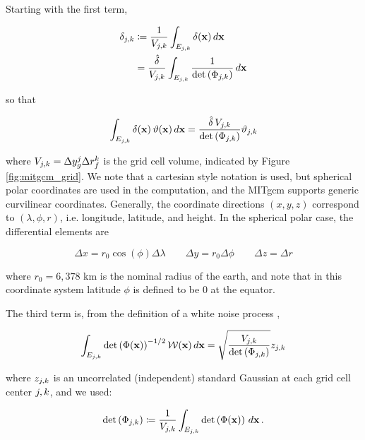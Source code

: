 Starting with the first term,
\begin{linenomath*}\begin{equation*}
    \begin{aligned}
        \delta_{j,k} &\coloneqq \dfrac{1}{V_{j,k}}\int_{E_{j,k}}\delta(\mathbf{x})\,d\mathbf{x}
        \\
                   &=
                   \dfrac{\hat{\delta}}{V_{j,k}}\int_{E_{j,k}}\dfrac{1}{\text{det}\left(\Phi_{{j,k}}\right)}\,d\mathbf{x}
    \end{aligned}
\end{equation*}\end{linenomath*}
so that
\begin{linenomath*}\begin{equation*}
    \int_{E_{j,k}} \delta(\mathbf{x})\,\vartheta(\mathbf{x})\, d\mathbf{x} =
    \dfrac{\hat{\delta}\,V_{j,k}}{\text{det}\left(\Phi_{{j,k}}\right)}\vartheta_{j,k}
\end{equation*}\end{linenomath*}
where $V_{j,k} = \Delta y^{j}_{g} \Delta r_f^k$ is the grid cell volume,
indicated by Figure \ref{fig:mitgcm_grid}.
We note that a cartesian style notation
is used, but spherical polar coordinates are used in the computation, and the
MITgcm supports generic curvilinear coordinates.
Generally, the coordinate directions $(x,y,z)$ correspond to $(\lambda,\phi,r)$,
i.e. longitude, latitude, and height.
In the spherical polar case, the differential elements are
\begin{linenomath*}\begin{equation*}
    \Delta x = r_0 \cos(\phi)\Delta\lambda \qquad
    \Delta y = r_0 \Delta \phi \qquad
    \Delta z = \Delta r
\end{equation*}\end{linenomath*}
where $r_0 = 6,378$ km is the nominal radius of the earth, and note that in this
coordinate system latitude $\phi$ is defined to be 0 at the equator.

The third term is, from the definition of a white noise process
\citep{adler_random_2007},
\begin{linenomath*}\begin{equation*}
    \int_{E_{j,k}}\text{det}\left(\Phi(\mathbf{x})\right)^{-1/2}\mathcal{W}(\mathbf{x}) \, d\mathbf{x}
        = \sqrt{\dfrac{V_{j,k}}{\text{det}\left(\Phi_{{j,k}}\right)}} z_{j,k}
\end{equation*}\end{linenomath*}
where $z_{j,k}$ is an uncorrelated (independent) standard Gaussian at each grid
cell center ${j,k}$, and we used:
\begin{linenomath*}\begin{equation*}
    \text{det}\left(\Phi_{{j,k}}\right) \coloneqq
    \dfrac{1}{V_{j,k}}\int_{E_{j,k}}\text{det}\left(\Phi(\mathbf{x})\right)\,d\mathbf{x}\,.
\end{equation*}\end{linenomath*}

